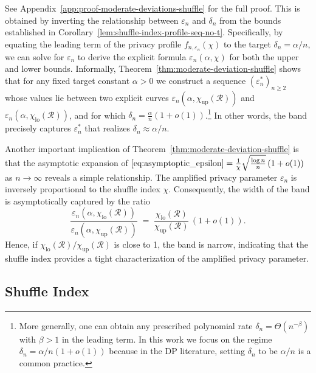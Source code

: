 \documentclass{article}
\theoremstyle{plain}
\theoremstyle{definition}
\begin{document}
See Appendix~\ref{app:proof-moderate-deviations-shuffle} for the full proof. 
This is obtained by inverting the relationship between $\varepsilon_n$ and $\delta_n$ from the bounds established in Corollary~\ref{lem:shuffle-index-profile-seq-no-t}. 
Specifically, by equating the leading term of the privacy profile $f_{n,\varepsilon_n}(\chi)$ to the target $\delta_n = \alpha/n$, we can solve for $\varepsilon_n$ to derive the explicit formula $\varepsilon_n(\alpha, \chi)$ for both the upper and lower bounds.
Informally, Theorem~\ref{thm:moderate-deviation-shuffle} shows that for any fixed target constant $\alpha>0$
we construct a sequence $(\varepsilon_n^\ast)_{n\ge2}$ whose values lie
between two explicit curves $\varepsilon_n(\alpha,\chi_{\mathrm{up}}(\mathcal{R}))$
and $\varepsilon_n(\alpha,\chi_{\mathrm{lo}}(\mathcal{R}))$, and for which $\delta_n
 = \frac{\alpha}{n}(1+o(1))$.\footnote{%
  More generally, one can obtain any prescribed
  polynomial rate $\delta_n = \Theta(n^{-\beta})$ with $\beta>1$ in the leading
  term.  In this work we focus on the regime $\delta_n = \alpha/n(1+o(1))$ because in the DP literature, setting $\delta_n$ to be $\alpha/n$ is a common practice.
 }
In other words, the band precisely captures $\varepsilon^\ast_n$ that realizes $\delta_n\approx\alpha/n$.


Another important implication of Theorem~\ref{thm:moderate-deviation-shuffle} is that the asymptotic expansion of $\eqref{eq:asymptoptic_epsilon}= \frac{1}{\chi}\sqrt{\frac{\log n}{n}}\left(1+o(1)\right)$ as $n\to\infty$ reveals a simple relationship.
The amplified privacy parameter $\varepsilon_n$ is inversely proportional to the shuffle index $\chi$. 
Consequently, the width of the band is asymptotically captured by the ratio
\[
  \frac{\varepsilon_n(\alpha,\chi_{\mathrm{lo}}(\mathcal{R}))}
       {\varepsilon_n(\alpha,\chi_{\mathrm{up}}(\mathcal{R}))}
  \;=\;
  \frac{\chi_{\mathrm{lo}}(\mathcal{R})}{\chi_{\mathrm{up}}(\mathcal{R})}\,
  \left(1+o(1)\right).
\]
Hence, if $\chi_{\mathrm{lo}}(\mathcal{R})/\chi_{\mathrm{up}}(\mathcal{R})$ is close to 1, the band is narrow, indicating that the shuffle index provides a tight characterization of the amplified privacy parameter.


\subsection{Shuffle Index}
\label{sec:shuffle_index}
\end{document}
